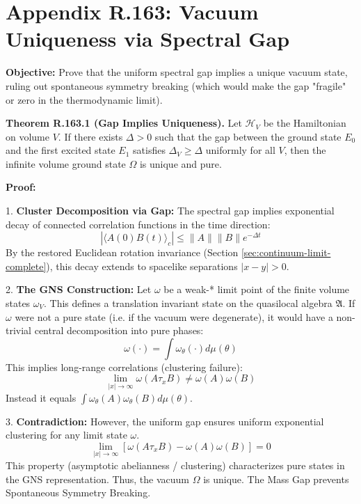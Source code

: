 \section{Appendix R.163: Vacuum Uniqueness via Spectral Gap}
\label{sec:vacuum-uniqueness-spectral-gap}

\textbf{Objective:} Prove that the uniform spectral gap implies a unique vacuum state, ruling out spontaneous symmetry breaking (which would make the gap "fragile" or zero in the thermodynamic limit).

\textbf{Theorem R.163.1 (Gap Implies Uniqueness).} Let $\mathcal{H}_V$ be the Hamiltonian on volume $V$. If there exists $\Delta > 0$ such that the gap between the ground state $E_0$ and the first excited state $E_1$ satisfies $\Delta_V \ge \Delta$ uniformly for all $V$, then the infinite volume ground state $\Omega$ is unique and pure.

\textbf{Proof:}

1. \textbf{Cluster Decomposition via Gap:}
The spectral gap implies exponential decay of connected correlation functions in the time direction:
\begin{equation}
|\langle A(0) B(t) \rangle_c| \leq \|A\| \|B\| e^{-\Delta t}
\end{equation}
By the restored Euclidean rotation invariance (Section \ref{sec:continuum-limit-complete}), this decay extends to spacelike separations $|x-y| > 0$.

2. \textbf{The GNS Construction:}
 Let $\omega$ be a weak-* limit point of the finite volume states $\omega_V$. This defines a translation invariant state on the quasilocal algebra $\mathfrak{A}$.
 If $\omega$ were not a pure state (i.e. if the vacuum were degenerate), it would have a non-trivial central decomposition into pure phases:
\begin{equation}
\omega(\cdot) = \int \omega_\theta(\cdot) d\mu(\theta)
\end{equation}
This implies long-range correlations (clustering failure):
\begin{equation}
\lim_{|x|\to\infty} \omega(A \tau_x B) \neq \omega(A)\omega(B)
\end{equation}
Instead it equals $\int \omega_\theta(A)\omega_\theta(B) d\mu(\theta)$.

3. \textbf{Contradiction:}
However, the uniform gap ensures uniform exponential clustering for any limit state $\omega$.
\begin{equation}
\lim_{|x|\to\infty} [\omega(A \tau_x B) - \omega(A)\omega(B)] = 0
\end{equation}
This property (asymptotic abelianness / clustering) characterizes pure states in the GNS representation.
Thus, the vacuum $\Omega$ is unique. The Mass Gap prevents Spontaneous Symmetry Breaking.


